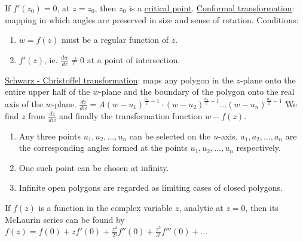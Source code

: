 \documentclass[12pt]{article}
\begin{document}
\begin{flushleft}
	\textbullet \quad If $f'(z_0) = 0$, at $z=z_0$, then $z_0$ is a \uline{critical point}. \linebreak 
	\textbullet \quad \uline{Conformal transformation}: mapping in which angles are preserved in size and sense of rotation. \linebreak 
	Conditions:  
	\begin{enumerate}
	\item $w=f(z)$ must be a regular function of $z$. 
	\item $f'(z)$, ie. $\displaystyle \frac{dw}{dz} \neq 0$ at a point of intersection. 
	\end{enumerate}

	\textbullet \quad \uline{Schwarz - Christoffel transformation}: maps any polygon in the $z$-plane onto the entire upper half of the $w$-plane and the boundary of the polygon onto the real axis of the $w$-plane. $\displaystyle \frac{dz}{dw} = A \left( w-u_1 \right)^{\frac{a_1}{\pi} -1} \cdot \left( w-u_2 \right)^{\frac{a_2}{\pi} -1} \ldots \left( w-u_n \right)^{\frac{a_n}{\pi} -1} $ \linebreak 
	We find $z$ from $\displaystyle \frac{dz}{dw}$ and finally the transformation function $w-f(z)$.  
	\begin{enumerate}
	\item Any three points $u_1, u_2,\ldots , u_n$ can be selected on the $u$-axis. $a_1, a_2, \ldots , a_n$ are the corresponding angles formed at the points $u_1,u_2,\ldots, u_n$ respectively. 
	\item One such point can be chosen at infinity. 
	\item Infinite open polygons are regarded as limiting cases of closed polygons. 
	\end{enumerate}
	
	\textbullet \quad If $f(z)$ is a function in the complex variable $z$, analytic at $z=0$, then its McLaurin series can be found by \linebreak 
	$\displaystyle f(z) = f(0) + zf'(0) + \frac{z^2}{2!} f''(0) + \frac{z^3}{3!} f'''(0) + \ldots $ \linebreak 
	

\end{flushleft}
\end{document}
